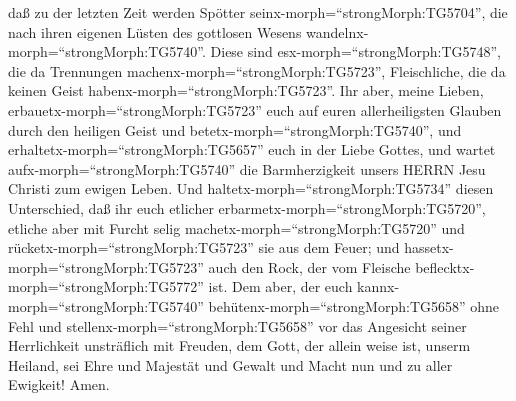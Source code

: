 daß zu der letzten Zeit werden Spötter
seinx-morph=``strongMorph:TG5704'', die nach ihren eigenen Lüsten des
gottlosen Wesens wandelnx-morph=``strongMorph:TG5740''. 
Diese sind esx-morph=``strongMorph:TG5748'', die da Trennungen
machenx-morph=``strongMorph:TG5723'', Fleischliche, die da keinen Geist
habenx-morph=``strongMorph:TG5723''.  Ihr aber, meine
Lieben, erbauetx-morph=``strongMorph:TG5723'' euch auf euren
allerheiligsten Glauben durch den heiligen Geist und
betetx-morph=``strongMorph:TG5740'',  und
erhaltetx-morph=``strongMorph:TG5657'' euch in der Liebe Gottes, und
wartet aufx-morph=``strongMorph:TG5740'' die Barmherzigkeit unsers HERRN
Jesu Christi zum ewigen Leben.  Und
haltetx-morph=``strongMorph:TG5734'' diesen Unterschied, daß ihr euch
etlicher erbarmetx-morph=``strongMorph:TG5720'',  etliche
aber mit Furcht selig machetx-morph=``strongMorph:TG5720'' und
rücketx-morph=``strongMorph:TG5723'' sie aus dem Feuer; und
hassetx-morph=``strongMorph:TG5723'' auch den Rock, der vom Fleische
beflecktx-morph=``strongMorph:TG5772'' ist.  Dem aber, der
euch kannx-morph=``strongMorph:TG5740''
behütenx-morph=``strongMorph:TG5658'' ohne Fehl und
stellenx-morph=``strongMorph:TG5658'' vor das Angesicht seiner
Herrlichkeit unsträflich mit Freuden,  dem Gott, der allein
weise ist, unserm Heiland, sei Ehre und Majestät und Gewalt und Macht
nun und zu aller Ewigkeit! Amen.
